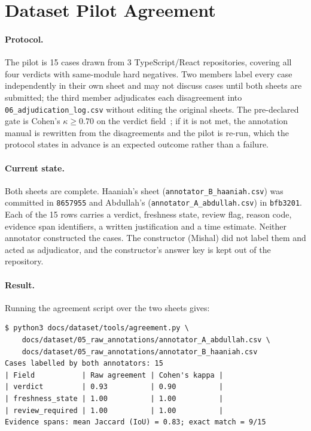 \section{Dataset Pilot Agreement}
\label{sec:agreement}

\paragraph{Protocol.} The pilot is 15 cases drawn from 3 TypeScript/React
repositories, covering all four verdicts with same-module hard negatives. Two
members label every case independently in their own sheet and may not discuss
cases until both sheets are submitted; the third member adjudicates each
disagreement into \texttt{06\_\allowbreak{}adjudication\_\allowbreak{}log.\allowbreak{}csv} without editing the
original sheets. The pre-declared gate is Cohen's $\kappa \geq 0.70$ on the
verdict field~\cite{cohen1960}; if it is not met, the annotation manual is
rewritten from the disagreements and the pilot is re-run, which the protocol
states in advance is an expected outcome rather than a failure.

\paragraph{Current state.} Both sheets are complete. Haaniah's sheet
(\texttt{annotator\_\allowbreak{}B\_\allowbreak{}haaniah.\allowbreak{}csv}) was committed in \texttt{8657955} and
Abdullah's (\texttt{annotator\_\allowbreak{}A\_\allowbreak{}abdullah.\allowbreak{}csv}) in \texttt{bfb3201}. Each of the
15 rows carries a verdict, freshness state, review flag, reason code, evidence
span identifiers, a written justification and a time estimate. Neither annotator
constructed the cases. The constructor (Mishal) did not label them and acted as
adjudicator, and the constructor's answer key is kept out of the repository.

\paragraph{Result.} Running the agreement script over the two sheets gives:

\begin{verbatim}
$ python3 docs/dataset/tools/agreement.py \
    docs/dataset/05_raw_annotations/annotator_A_abdullah.csv \
    docs/dataset/05_raw_annotations/annotator_B_haaniah.csv
Cases labelled by both annotators: 15
| Field           | Raw agreement | Cohen's kappa |
| verdict         | 0.93          | 0.90          |
| freshness_state | 1.00          | 1.00          |
| review_required | 1.00          | 1.00          |
Evidence spans: mean Jaccard (IoU) = 0.83; exact match = 9/15
\end{verbatim}

